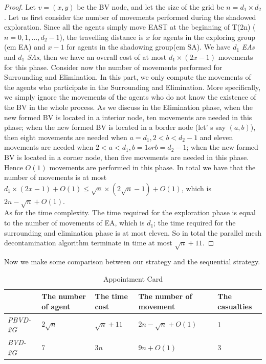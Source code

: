 \begin{proof}
Let $v=(x, y)$ be the BV node, and let the size of the grid be $n=d_1\times d_2$. Let us first consider the number of movements performed during the shadowed exploration. Since all the agents simply move EAST at the beginning of T(2n) ($n=0,1, \dots , d_2-1$), the travelling distance is $x$ for agents in the exploring group ({em EA}) and $x-1$ for agents in the shadowing group({em SA}). We have $d_1$ {\em EAs} and $d_1$ {\em SAs}, then we have an overall cost of at most $d_1\times (2x-1)$ movements for this phase.
Consider now the number of movements performed for Surrounding and Elimination. In this part, we only compute the movements of the agents who participate in the Surrounding and Elimination. More specifically, we simply ignore the movements of the agents who do not know the existence of the BV in the whole process. As we discuss in the Elimination phase, when the new formed BV is located in a interior node, ten movements are needed in this phase; when the new formed BV is located in a border node (let' s say $(a, b)$), then eight movements are needed when $a=d_1, 2< b <d_2-1$ and eleven movements are needed when $2< a <d_1,b=1 or b=d_2-1$; when the new formed BV is located in a corner node, then five movements are needed in this phase. Hence $O(1)$ movements are performed in this phase.
In total we have that the number of movements is at most $d_1 \times(2x-1)+O(1)\leq \sqrt{n}\times(2\sqrt{n}-1)+O(1)$, which is $2n-\sqrt{n}+O(1)$.\\
As for the time complexity. The time required for the exploration phase is equal to the number of movements of EA, which is $d_1$; the time required for the surrounding and elimination phase is at most eleven. So in total the parallel mesh decontamination algorithm terminate in time at most $\sqrt{n}+11$. 
\end{proof}

Now we make some comparison between our strategy and the sequential strategy.

\begin{table} [hbtp]
\caption{Appointment Card}
\label{table:AptCard}
\centering
\tabulinesep=2mm
\begin{tabu} to 140 mm {|X[6,c]|X[4,l]|X[4,l]|X[4,l]|X[4,l]|} \hline 
& The number of agent & The time cost & The number of movement & The casualties \\ \hline
{\em PBVD-2G}   & $2\sqrt{n}$   & $\sqrt{n}+11$ & $2n-\sqrt{n}+O(1)$   & 1        \\ \hline
{\em BVD-2G} & 7    & $3n$          & $9n+O(1)$     & 3              \\ \hline
\end{tabu}
\end{table}

